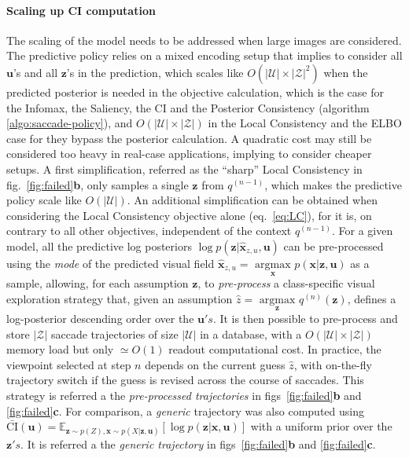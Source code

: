 \documentclass{article}
\begin{document}
\paragraph{Scaling up CI computation}
The scaling of the model needs to be addressed when large images are considered. The predictive policy relies on a mixed encoding setup that implies to consider all $\boldsymbol{u}$'s and all $\boldsymbol{z}$'s in the prediction, which scales like $O(|\mathcal{U}|\times|\mathcal{Z}|^2)$ when the predicted posterior is needed in the objective calculation, which is the case for the Infomax, the Saliency, the CI and the Posterior Consistency (algorithm \ref{algo:saccade-policy}), and $O(|\mathcal{U}|\times|\mathcal{Z}|)$ in the Local Consistency and the ELBO case for they bypass the posterior calculation. A quadratic cost may still be considered too heavy in real-case applications, implying to consider cheaper setups. A first simplification, referred as the ``sharp'' Local Consistency in  fig.~\ref{fig:failed}\textbf{b}, only samples a single $\boldsymbol{z}$ from $q^{(n-1)}$, which makes the predictive policy scale like $O(|\mathcal{U}|)$. An additional simplification can be obtained when considering the Local Consistency objective alone (eq.~\ref{eq:LC}), for it is, on contrary to all other objectives, independent of the context $q^{(n-1)}$. For a given model, all the predictive log posteriors $\log p(\boldsymbol{z}|\hat{\boldsymbol{x}}_{z,u}, \boldsymbol{u})$ can be pre-processed using the \emph{mode} of the predicted visual field $\hat{\boldsymbol{x}}_{z,u} = \underset{\boldsymbol{x}}{\text{ argmax }} p(\boldsymbol{x}|\boldsymbol{z}, \boldsymbol{u})$ as a sample, allowing, for each assumption $\boldsymbol{z}$, to \emph{pre-process} a class-specific visual exploration strategy that, given an assumption $\hat{z} = \underset{\boldsymbol{\boldsymbol{z}}}{\text{ argmax }} q^{(n)}(\boldsymbol{z})$, defines a log-posterior descending order over the $\boldsymbol{u}'s$. It is then possible to pre-process and store $|\mathcal{Z}|$ saccade trajectories of size $|\mathcal{U}|$ in a database, with a $O(|\mathcal{U}|\times|\mathcal{Z}|)$ memory load but only $\simeq O(1)$ readout computational cost. In practice, the viewpoint selected at step $n$ depends on the current guess $\hat{z}$, with on-the-fly trajectory switch if the guess is revised across the course of saccades. This strategy is referred a the \emph{pre-processed trajectories} in figs~\ref{fig:failed}\textbf{b} and \ref{fig:failed}\textbf{c}.
For comparison, a \emph{generic} trajectory was also computed using $\bar{\text{CI}}(\boldsymbol{u})
= \mathbb{E}_{\boldsymbol{z} \sim p(Z), \boldsymbol{x} \sim p(X|\boldsymbol{z}, \boldsymbol{u})}\left[ \log p(\boldsymbol{z}|\boldsymbol{x}, \boldsymbol{u})\right]$ with a uniform prior over the $\boldsymbol{z}'s$.  
It is referred a the \emph{generic trajectory} in figs~\ref{fig:failed}\textbf{b} and \ref{fig:failed}\textbf{c}.
\end{document}
